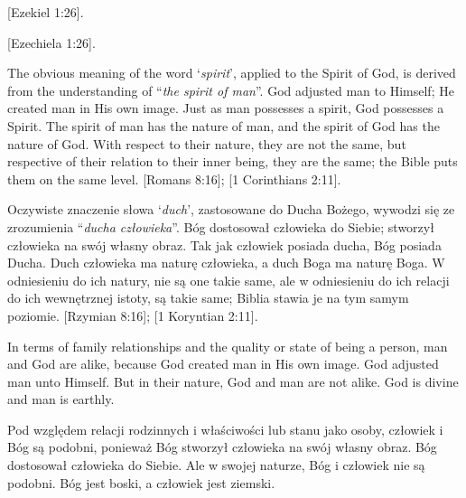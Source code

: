 [Ezekiel 1:26].


[Ezechiela 1:26].


The obvious meaning of the word ‘\textit{spirit}’, applied to the Spirit of God, is derived from the understanding of “\textit{the spirit of man}”. God adjusted man to Himself; He created man in His own image. Just as man possesses a spirit, God possesses a Spirit. The spirit of man has the nature of man, and the spirit of God has the nature of God. With respect to their nature, they are not the same, but respective of their relation to their inner being, they are the same; the Bible puts them on the same level. [Romans 8:16]; [1 Corinthians 2:11].


Oczywiste znaczenie słowa ‘\textit{duch}’, zastosowane do Ducha Bożego, wywodzi się ze zrozumienia “\textit{ducha człowieka}”. Bóg dostosował człowieka do Siebie; stworzył człowieka na swój własny obraz. Tak jak człowiek posiada ducha, Bóg posiada Ducha. Duch człowieka ma naturę człowieka, a duch Boga ma naturę Boga. W odniesieniu do ich natury, nie są one takie same, ale w odniesieniu do ich relacji do ich wewnętrznej istoty, są takie same; Biblia stawia je na tym samym poziomie. [Rzymian 8:16]; [1 Koryntian 2:11].


In terms of family relationships and the quality or state of being a person, man and God are alike, because God created man in His own image. God adjusted man unto Himself. But in their nature, God and man are not alike. God is divine and man is earthly.


Pod względem relacji rodzinnych i właściwości lub stanu jako osoby, człowiek i Bóg są podobni, ponieważ Bóg stworzył człowieka na swój własny obraz. Bóg dostosował człowieka do Siebie. Ale w swojej naturze, Bóg i człowiek nie są podobni. Bóg jest boski, a człowiek jest ziemski.


